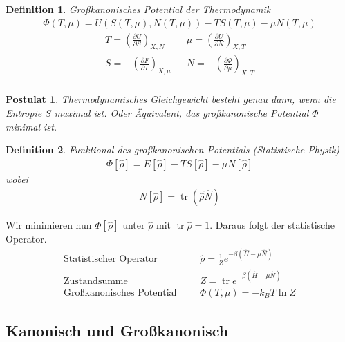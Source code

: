 \documentclass[11pt]{article}
\theoremstyle{plain}
\newtheorem*{postulat}{Postulat}
\newtheorem*{definition}{Definition}
\theoremstyle{mytheoremstyle}
\newcommand{\pd}[2]{\frac{\partial #1 }{\partial #2}}
\newcommand{\trace}{\operatorname{tr}}
\begin{document}
\begin{definition} Gro\ss{}kanonisches Potential der Thermodynamik
    \begin{align*}
      \Phi(T, \mu) = U\left( S (T, \mu), N(T, \mu) \right) - 
      T S(T, \mu)  - \mu N(T, \mu) 
    \end{align*}
    \begin{align*}
      T = \left( \pd{U}{S} \right)_{X, N} && \mu = \left( \pd{ U}{N} \right)_{X, T} \\
      S = - \left( \pd{F}{T} \right)_{X, \mu} && N = -\left( \pd{\Phi}{\mu} \right)_{X, T} \\
    \end{align*}
\end{definition}

%
\begin{postulat}
    Thermodynamisches Gleichgewicht besteht genau dann, wenn
    die Entropie $S$ maximal ist. Oder \"Aquivalent, das gro\ss{}kanonische
    Potential $\Phi$ minimal ist.
\end{postulat}

\begin{definition}
    Funktional des gro\ss{}kanonischen Potentials
    (Statistische Physik)
    \begin{align*}
        \Phi[\hat{\rho}] = E \left[ \hat{\rho} \right] - T S [\hat{\rho}]
        - \mu N[ \hat{\rho}]
    \end{align*}
    wobei %
    \begin{align*}
        N [\hat{\rho}] = \trace (\hat{\rho} \hat{N})
    \end{align*}
\end{definition}
        
Wir minimieren nun $\Phi[\hat{\rho}]$ unter $\hat{\rho}$ mit
$ \trace \hat{\rho} = 1$. Daraus folgt der statistische Operator.
%
\begin{align*}
    \text{Statistischer Operator} && & \hat{\rho} = \frac{1}{Z} 
    e^{- \beta (\hat{H} - \mu \hat{N})} \\
    \text{Zustandsumme } && & Z = \trace e^{-\beta (\hat{H} - \mu \hat{N})}  \\
    \text{Gro\ss{}kanonisches Potential}  && &
    \Phi (T, \mu) = -k_B T \ln{Z} 
\end{align*}
\subsection*{Kanonisch und Gro\ss{}kanonisch}
\end{document}
